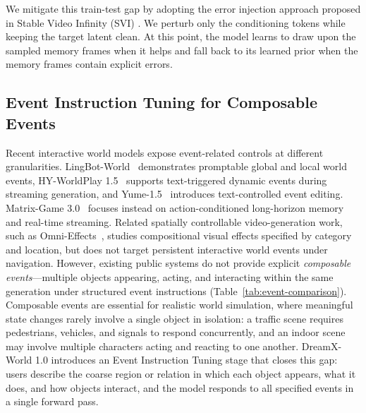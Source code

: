 \documentclass{llmxive}
\providecommand{\method}{DreamX-World 1.0}
\begin{document}
We mitigate this train-test gap by adopting the error injection approach proposed in Stable Video Infinity (SVI) \citep{li2025stablevideoinfinity}.
We perturb only the conditioning tokens while keeping the target latent
clean.
At this point, the model learns to draw upon the sampled memory frames when it helps and fall back to its learned prior when the memory frames contain explicit errors.

\subsection{Event Instruction Tuning for Composable Events}

Recent interactive world models expose event-related controls at different
granularities.
LingBot-World~\citep{gao2026lingbotworld} demonstrates promptable global and
local world events, HY-WorldPlay 1.5~\citep{hyworld2025,sun2025worldplay}
supports text-triggered dynamic events during streaming generation, and
Yume-1.5~\citep{mao2025yume15} introduces text-controlled event editing.
Matrix-Game 3.0~\citep{wang2026matrixgame} focuses instead on action-conditioned
long-horizon memory and real-time streaming.
Related spatially controllable video-generation work, such as
Omni-Effects~\citep{mao2025omnieffects}, studies compositional visual effects
specified by category and location, but does not target persistent interactive
world events under navigation.
However, existing public systems do not provide explicit \emph{composable
events}---multiple objects appearing, acting, and interacting within the same
generation under structured event instructions
(Table~\ref{tab:event-comparison}).
Composable events are essential for realistic world simulation, where
meaningful state changes rarely involve a single object in isolation:
a traffic scene requires pedestrians, vehicles, and signals to respond
concurrently, and an indoor scene may involve multiple characters acting and
reacting to one another.
\method{} introduces an Event Instruction Tuning stage that closes this gap:
users describe the coarse region or relation in which each object appears,
what it does, and how objects interact, and the model responds to all specified
events in a single forward pass.
\end{document}
